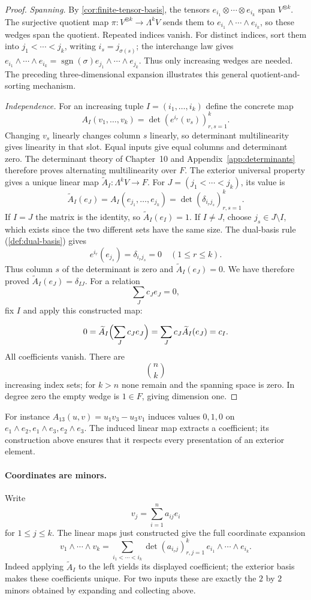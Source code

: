 \begin{proof}
\emph{Spanning.} By \cref{cor:finite-tensor-basis}, the tensors
$e_{i_1}\otimes\cdots\otimes e_{i_k}$ span $V^{\otimes k}$.
The surjective quotient map $\pi:V^{\otimes k}\to\Lambda^kV$ sends them
to $e_{i_1}\wedge\cdots\wedge e_{i_k}$, so these wedges span the quotient.
Repeated indices vanish. For distinct indices, sort them into
$j_1<\cdots<j_k$, writing $i_s=j_{\sigma(s)}$; the interchange law gives
$e_{i_1}\wedge\cdots\wedge e_{i_k}
=\operatorname{sgn}(\sigma)e_{j_1}\wedge\cdots\wedge e_{j_k}$.
Thus only increasing wedges are needed. The preceding three-dimensional
expansion illustrates this general quotient-and-sorting mechanism.

\emph{Independence.} For an increasing tuple $I=(i_1,\ldots,i_k)$ define
the concrete map
\[
A_I(v_1,\ldots,v_k)=\det(e^{i_r}(v_s))_{r,s=1}^k.
\]
Changing $v_s$ linearly changes column $s$ linearly, so determinant
multilinearity gives linearity in that slot. Equal inputs give equal
columns and determinant zero. The determinant theory of Chapter~10 and
Appendix~\ref{app:determinants} therefore proves alternating multilinearity over $F$.
The exterior universal property gives a unique linear map
$\widetilde A_I:\Lambda^kV\to F$. For $J=(j_1<\cdots<j_k)$, its value is
\[
\widetilde A_I(e_J)=A_I(e_{j_1},\ldots,e_{j_k})
=\det(\delta_{i_rj_s})_{r,s=1}^k.
\]
If $I=J$ the matrix
is the identity, so $\widetilde A_I(e_I)=1$. If $I\ne J$, choose $j_s\in J\setminus I$, which exists since the two
different sets have the same size. The dual-basis rule
(\cref{def:dual-basis}) gives
\[
e^{i_r}(e_{j_s})=\delta_{i_rj_s}=0\quad(1\leq r\leq k).
\]
Thus column $s$ of the determinant is zero and $\widetilde A_I(e_J)=0$.
We have therefore proved $\widetilde A_I(e_J)=\delta_{IJ}$.
For a relation
\[
\sum_Jc_Je_J=0,
\]
 fix $I$ and apply this constructed map:

\[
0=\widetilde A_I\Bigl(\sum_Jc_Je_J\Bigr)=\sum_Jc_J\widetilde A_I(e_J)=c_I.
\]
All coefficients vanish. There are
\[
\binom nk
\]
 increasing index sets;
for $k>n$ none remain and the spanning space is zero. In degree zero the
empty wedge is $1\in F$, giving dimension one.
\end{proof}
For instance $A_{13}(u,v)=u_1v_3-u_3v_1$ induces values $0,1,0$ on
$e_1\wedge e_2,e_1\wedge e_3,e_2\wedge e_3$. The induced linear map extracts a coefficient; its construction above
ensures that it respects every presentation of an exterior element.

\paragraph{Coordinates are minors.}
Write
\[
v_j=\sum_{i=1}^n a_{ij}e_i
\]
 for $1\leq j\leq k$. The linear maps just constructed give the full coordinate expansion
\[
v_1\wedge\cdots\wedge v_k
=\sum_{i_1<\cdots<i_k}\det(a_{i_rj})_{r,j=1}^k
\,e_{i_1}\wedge\cdots\wedge e_{i_k}.
\]
Indeed applying $\widetilde A_I$ to the left yields its displayed coefficient;
the exterior basis makes these coefficients unique. For two inputs these
are exactly the $2$ by $2$ minors obtained by expanding and collecting above.

